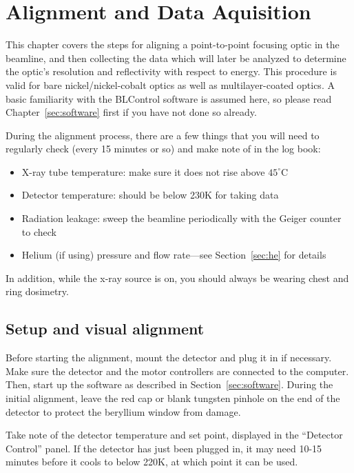 \chapter{Alignment and Data Aquisition}

This chapter covers the steps for aligning a point-to-point focusing optic in
the beamline, and then collecting the data which will later be analyzed to
determine the optic's resolution and reflectivity with respect to energy. This
procedure is valid for bare nickel/nickel-cobalt optics as well as
multilayer-coated optics. A basic familiarity with the BLControl software is
assumed here, so please read Chapter~\ref{sec:software} first if you have not
done so already.

During the alignment process, there are a few things that you will need to
regularly check (every 15 minutes or so) and make note of in the log book:

\begin{itemize}

\item X-ray tube temperature: make sure it does not rise above $45^\circ$C
\item Detector temperature: should be below 230K for taking data
\item Radiation leakage: sweep the beamline periodically with the Geiger counter
  to check
\item Helium (if using) pressure and flow rate---see Section~\ref{sec:he} for
  details

\end{itemize}
In addition, while the x-ray source is on, you should always be wearing chest
and ring dosimetry.

\section{Setup and visual alignment}

Before starting the alignment, mount the detector and plug it in if
necessary. Make sure the detector and the motor controllers are connected to the
computer. Then, start up the software as described in
Section~\ref{sec:software}. During the initial alignment, leave the red cap or
blank tungsten pinhole on the end of the detector to protect the beryllium
window from damage.

Take note of the detector temperature and set point, displayed in the ``Detector
Control'' panel. If the detector has just been plugged in, it may need 10-15
minutes before it cools to below 220K, at which point it can be used.


